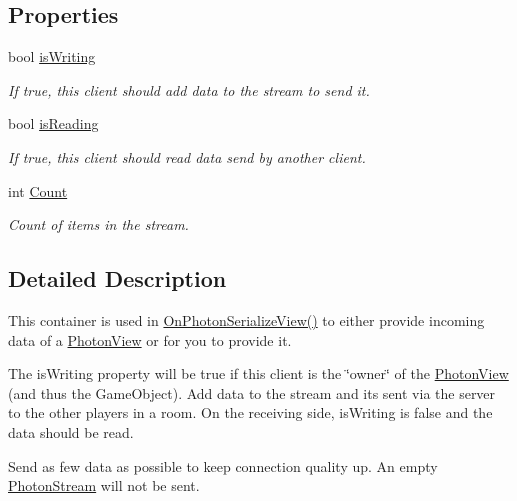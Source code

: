 \subsection*{Properties}
\begin{DoxyCompactItemize}
\item 
bool \hyperlink{class_photon_stream_a99e20ecd7737381042751acf8ec8fc4b}{is\+Writing}
\begin{DoxyCompactList}\small\item\em If true, this client should add data to the stream to send it.\end{DoxyCompactList}\item 
bool \hyperlink{class_photon_stream_a8192fc59b4ffe6ecc3ac70a793b36dc5}{is\+Reading}
\begin{DoxyCompactList}\small\item\em If true, this client should read data send by another client.\end{DoxyCompactList}\item 
int \hyperlink{class_photon_stream_a67f264145ca1f4d1cb8518cbbb607797}{Count}
\begin{DoxyCompactList}\small\item\em Count of items in the stream.\end{DoxyCompactList}\end{DoxyCompactItemize}


\subsection{Detailed Description}
This container is used in \hyperlink{group__public_api_ggaf30bbea51cc8c4b1ddc239d1c5c1468fa864e7f0d7510922caf9c107b8dd771a3}{On\+Photon\+Serialize\+View()} to either provide incoming data of a \hyperlink{class_photon_view}{Photon\+View} or for you to provide it. 

The is\+Writing property will be true if this client is the \char`\"{}owner\char`\"{} of the \hyperlink{class_photon_view}{Photon\+View} (and thus the Game\+Object). Add data to the stream and it\textquotesingle{}s sent via the server to the other players in a room. On the receiving side, is\+Writing is false and the data should be read.

Send as few data as possible to keep connection quality up. An empty \hyperlink{class_photon_stream}{Photon\+Stream} will not be sent.

